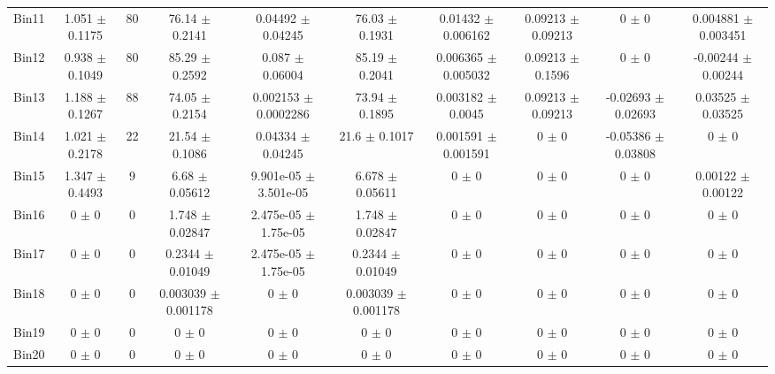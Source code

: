 \begin{tabular}{@{\extracolsep{4pt}}lccccccccc@{}}
     Bin11 & 1.051 $\pm$ 0.1175 & 80 & 76.14 $\pm$ 0.2141 & 0.04492 $\pm$ 0.04245 & 76.03 $\pm$ 0.1931 & 0.01432 $\pm$ 0.006162 & 0.09213 $\pm$ 0.09213 & 0 $\pm$ 0 & 0.004881 $\pm$ 0.003451 \\ 
     Bin12 & 0.938 $\pm$ 0.1049 & 80 & 85.29 $\pm$ 0.2592 & 0.087 $\pm$ 0.06004 & 85.19 $\pm$ 0.2041 & 0.006365 $\pm$ 0.005032 & 0.09213 $\pm$ 0.1596 & 0 $\pm$ 0 & -0.00244 $\pm$ 0.00244 \\ 
     Bin13 & 1.188 $\pm$ 0.1267 & 88 & 74.05 $\pm$ 0.2154 & 0.002153 $\pm$ 0.0002286 & 73.94 $\pm$ 0.1895 & 0.003182 $\pm$ 0.0045 & 0.09213 $\pm$ 0.09213 & -0.02693 $\pm$ 0.02693 & 0.03525 $\pm$ 0.03525 \\ 
     Bin14 & 1.021 $\pm$ 0.2178 & 22 & 21.54 $\pm$ 0.1086 & 0.04334 $\pm$ 0.04245 & 21.6 $\pm$ 0.1017 & 0.001591 $\pm$ 0.001591 & 0 $\pm$ 0 & -0.05386 $\pm$ 0.03808 & 0 $\pm$ 0 \\ 
     Bin15 & 1.347 $\pm$ 0.4493 & 9 & 6.68 $\pm$ 0.05612 & 9.901e-05 $\pm$ 3.501e-05 & 6.678 $\pm$ 0.05611 & 0 $\pm$ 0 & 0 $\pm$ 0 & 0 $\pm$ 0 & 0.00122 $\pm$ 0.00122 \\ 
     Bin16 & 0 $\pm$ 0 & 0 & 1.748 $\pm$ 0.02847 & 2.475e-05 $\pm$ 1.75e-05 & 1.748 $\pm$ 0.02847 & 0 $\pm$ 0 & 0 $\pm$ 0 & 0 $\pm$ 0 & 0 $\pm$ 0 \\ 
     Bin17 & 0 $\pm$ 0 & 0 & 0.2344 $\pm$ 0.01049 & 2.475e-05 $\pm$ 1.75e-05 & 0.2344 $\pm$ 0.01049 & 0 $\pm$ 0 & 0 $\pm$ 0 & 0 $\pm$ 0 & 0 $\pm$ 0 \\ 
     Bin18 & 0 $\pm$ 0 & 0 & 0.003039 $\pm$ 0.001178 & 0 $\pm$ 0 & 0.003039 $\pm$ 0.001178 & 0 $\pm$ 0 & 0 $\pm$ 0 & 0 $\pm$ 0 & 0 $\pm$ 0 \\ 
     Bin19 & 0 $\pm$ 0 & 0 & 0 $\pm$ 0 & 0 $\pm$ 0 & 0 $\pm$ 0 & 0 $\pm$ 0 & 0 $\pm$ 0 & 0 $\pm$ 0 & 0 $\pm$ 0 \\ 
     Bin20 & 0 $\pm$ 0 & 0 & 0 $\pm$ 0 & 0 $\pm$ 0 & 0 $\pm$ 0 & 0 $\pm$ 0 & 0 $\pm$ 0 & 0 $\pm$ 0 & 0 $\pm$ 0 \\ 
\hline\hline
  \end{tabular}
